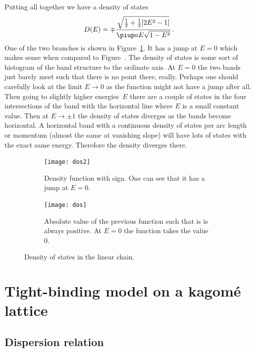 \documentclass[11pt, english, fleqn, DIV=15, headinclude, BCOR=1cm]{scrartcl}
\begin{document}
Putting all together we have a density of states
\[
    D(E) = \mp \frac{\sqrt{\frac 12 + \frac 12 [2 E^2 - 1]}}{\piup a E \sqrt{1 -
    E^2}} \,.
\]
One of the two branches is shown in Figure~\ref{fig:dos/2}. It has a jump at $E
= 0$ which makes sense when compared to Figure~\label{fig:band-3}. The density
of states is some sort of histogram of the band structure to the ordinate axis.
At $E = 0$ the two bands just barely meet such that there is no point there,
really. Perhaps one should carefully look at the limit $E \to 0$ as the
function might not have a jump after all. Then going to slightly higher
energies~$E$ there are a couple of states in the four intersections of the band
with the horizontal line where $E$ is a small constant value. Then at $E \to
\pm 1$ the density of states diverges as the bands become horizontal. A
horizontal band with a continuous density of states per arc length or momentum
(almost the same at vanishing slope) will have lots of states with the exact
same energy. Therefore the density diverges there.

\begin{figure}
    \begin{subfigure}[t]{0.47\linewidth}
        \centering
        \texttt{[image: dos2]}
        \caption{%
            Density function with sign. One can see that it has a jump at $E =
            0$.
        }
        \label{fig:dos/2}
    \end{subfigure}
    \hfill
    \begin{subfigure}[t]{0.47\linewidth}
        \centering
        \texttt{[image: dos]}
        \caption{%
            Absolute value of the previous function such that is is always
            positive. At $E = 0$ the function takes the value 0.
        }
        \label{fig:dos/1}
    \end{subfigure}
    \caption{%
        Density of states in the linear chain.
    }
    \label{fig:dos}
\end{figure}

\section{Tight-binding model on a kagomé lattice}
\label{homework:2}

\subsection{Dispersion relation}
\end{document}
